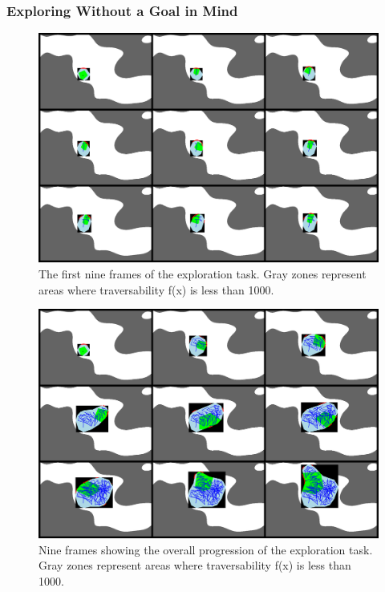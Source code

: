 \subsubsection{Exploring Without a Goal in Mind}

\begin{figure}[h]
    \centering
    \includegraphics[width=1\linewidth]{figures/explore.png}
    \caption{The first nine frames of the exploration task. Gray zones represent areas where traversability f(x) is less than 1000.}
    \label{fig:explore}
\end{figure}

\begin{figure}[h]
    \centering
    \includegraphics[width=1\linewidth]{figures/explorefull.png}
    \caption{Nine frames showing the overall progression of the exploration task. Gray zones represent areas where traversability f(x) is less than 1000.}
    \label{fig:explorefull}
\end{figure}

